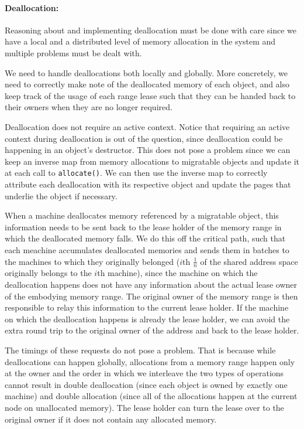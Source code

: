 \paragraph{Deallocation:} Reasoning about and implementing deallocation must
be done with care since we have a local and a distributed level of memory
allocation in the system and multiple problems must be dealt with.

We need to handle deallocations both locally and globally. More concretely, we
need to correctly make note of the deallocated memory of each object, and also
keep track of the usage of each range lease such that they can be handed back
to their owners when they are no longer required.

Deallocation does not require an active context. Notice that requiring
an active context during deallocation is out of the question, since
deallocation could be happening in an object's destructor. This does not pose
a problem since we can keep an inverse map from memory allocations to
migratable objects and update it at each call to \texttt{allocate()}. We can
then use the inverse map to correctly attribute each deallocation with its
respective object and update the pages that underlie the object if necessary.

When a machine deallocates memory referenced by a migratable object, this
information needs to be sent back to the lease holder of the memory range in
which the deallocated memory falls. We do this off the critical path, such that
each meachine accumulates deallocated memories and sends them in batches to
the machines to which they originally belonged ($i$th $\frac{1}{n}$ of the
shared address space originally belongs to the $i$th machine), since the machine
on which the
deallocation happens does not have any information about
the actual lease owner of the embodying memory range. The original owner
of the memory range is then responsible to relay this information to the current
lease holder. If the machine on which the deallocation happens is already the
lease holder, we can avoid the extra round trip to the original owner of the
address and back to the lease holder.

The timings of these requests do not pose a problem. That is
because while deallocations can happen globally, allocations from a memory range
happen only at the owner and the order in which we interleave the two types of
operations cannot result in double deallocation (since each object is owned by
exactly one machine) and double allocation (since all of the allocations happen
at the current node on unallocated memory). The lease holder can turn the lease
over to the original owner if it does not contain any allocated memory.

